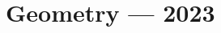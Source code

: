 \documentclass[
    fontsize=11pt, %
    twoside=false, %
    secnumdepth=2, %
    parskip=full-, %
    fontmethod=tex, %
]{kaobook}
\begin{document}
\vfill

\newpage
\thispagestyle{empty}
~
\newpage


\mainmatter %

\part{Geometry — 2023}



\backmatter %
\end{document}

